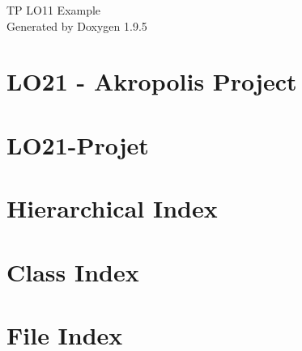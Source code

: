 \documentclass[twoside]{book}
\newcommand{\+}{\discretionary{\mbox{\scriptsize$\hookleftarrow$}}{}{}}
\newcommand{\clearemptydoublepage}{%
    \newpage{\pagestyle{empty}\cleardoublepage}%
  }
\begin{document}
  \raggedbottom
    \hypersetup{pageanchor=false,
                bookmarksnumbered=true,
                pdfencoding=unicode
               }
  \begin{titlepage}
  \vspace*{7cm}
  \begin{center}%
  {\Large TP LO11 Example}\\
  \vspace*{1cm}
  {\large Generated by Doxygen 1.9.5}\\
  \end{center}
  \end{titlepage}
  \clearemptydoublepage
  \tableofcontents
  \clearemptydoublepage
  \hypersetup{pageanchor=true}
\chapter{LO21 -\/ Akropolis Project}
\label{index}\hypertarget{index}{}
\chapter{LO21-\/\+Projet}
\label{md_README}

\chapter{Hierarchical Index}

\chapter{Class Index}

\chapter{File Index}

\end{document}
